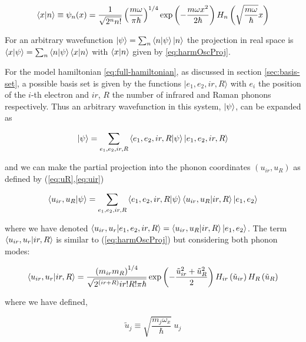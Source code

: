\begin{equation}\label{eq:harmOscProj}
\left\langle x|n\right\rangle 
\equiv \psi_n(x) 
= \frac{1}{\sqrt{2^n n!}} \left(\frac{m \omega}{\pi \hbar}\right)^{1/4}
  \exp\left(-\frac{m \omega x^2}{2 \hbar}\right) H_n\left( \sqrt{\frac{m \omega}{\hbar}} x \right) 
\end{equation}


For an arbitrary wavefunction $\left | \psi \right\rangle = \sum_n \left\langle n|\psi\right\rangle \left | n \right\rangle$ the projection in real space is $\left\langle x|\psi\right\rangle = \sum_n \left\langle n|\psi\right\rangle \left\langle x|n\right\rangle$ with $\left\langle x|n\right\rangle$ given by \ref{eq:harmOscProj}.

For the model hamiltonian \ref{eq:full-hamiltonian}, as discussed in section \ref{sec:basis-set}, a possible basis set is given by the functions ${| e_1, e_2, ir, R \rangle}$ with $e_i$ the position of the $i$-th electron and $ir$, $R$ the number of infrared and Raman phonons respectively. 
Thus an arbitrary wavefunction in this system, $\left | \psi \right\rangle$, can be expanded as

\begin{equation}\label{eq:wf-phonon-base}
\left | \psi \right\rangle=\sum_{e_1,e_2,ir,R} \left\langle e_1,e_2,ir,R|\psi\right\rangle\left | e_1,e_2,ir,R \right\rangle
\end{equation}

\noindent and we can make the partial projection into the phonon coordinates $(u_{ir},u_R)$ as defined by (\ref{eq:uR},\ref{eq:uir})

\begin{equation}\label{eq:wf-expansion}
\left\langle u_{ir},u_R|\psi\right\rangle=\sum_{e_1,e_2,ir,R} \left\langle e_1,e_2,ir,R|\psi\right\rangle\left\langle u_{ir},u_R|ir,R\right\rangle\left | e_1,e_2 \right\rangle
\end{equation}

\noindent where we have denoted $\left\langle u_{ir},u_r|e_1,e_2,ir,R\right\rangle=\left\langle u_{ir},u_R|ir,R\right\rangle\left | e_1,e_2 \right\rangle$. 
The term $\left\langle u_{ir},u_r|ir,R\right\rangle$ is similar to (\ref{eq:harmOscProj}) but considering both phonon modes:

\begin{equation}\label{eq:hermite-expansion}
\left\langle u_{ir},u_r|ir,R\right\rangle  = \frac{\left(m_{ir}m_R\right)^{1/4}}{\sqrt{2^{(ir+R)} ir!R!\pi\hbar}}
\exp\left(-\frac{\tilde{u}_{ir}^2 + \tilde{u}_R^2}{2}\right) 
H_{ir}\left(\tilde{u}_{ir} \right)H_{R}\left(\tilde{u}_{R} \right)
\end{equation}

\noindent where we have defined,

\begin{equation}\label{eq:uTildeDef}
\tilde{u}_j \equiv \sqrt{\frac{m_j\omega_x}{\hbar}}\ u_j
\end{equation}

